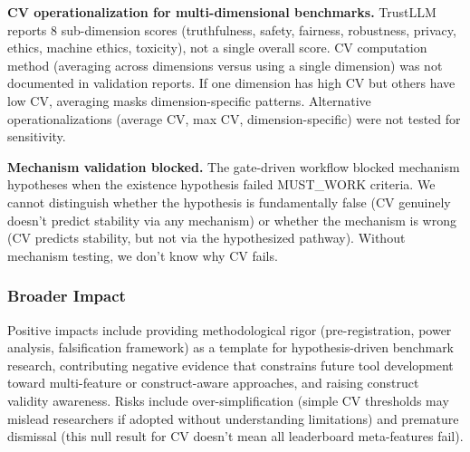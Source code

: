 \textbf{CV operationalization for multi-dimensional benchmarks.} TrustLLM reports 8 sub-dimension scores (truthfulness, safety, fairness, robustness, privacy, ethics, machine ethics, toxicity), not a single overall score. CV computation method (averaging across dimensions versus using a single dimension) was not documented in validation reports. If one dimension has high CV but others have low CV, averaging masks dimension-specific patterns. Alternative operationalizations (average CV, max CV, dimension-specific) were not tested for sensitivity.

\textbf{Mechanism validation blocked.} The gate-driven workflow blocked mechanism hypotheses when the existence hypothesis failed MUST\_WORK criteria. We cannot distinguish whether the hypothesis is fundamentally false (CV genuinely doesn't predict stability via any mechanism) or whether the mechanism is wrong (CV predicts stability, but not via the hypothesized pathway). Without mechanism testing, we don't know why CV fails.

\subsubsection{Broader Impact}

Positive impacts include providing methodological rigor (pre-registration, power analysis, falsification framework) as a template for hypothesis-driven benchmark research, contributing negative evidence that constrains future tool development toward multi-feature or construct-aware approaches, and raising construct validity awareness. Risks include over-simplification (simple CV thresholds may mislead researchers if adopted without understanding limitations) and premature dismissal (this null result for CV doesn't mean all leaderboard meta-features fail).
